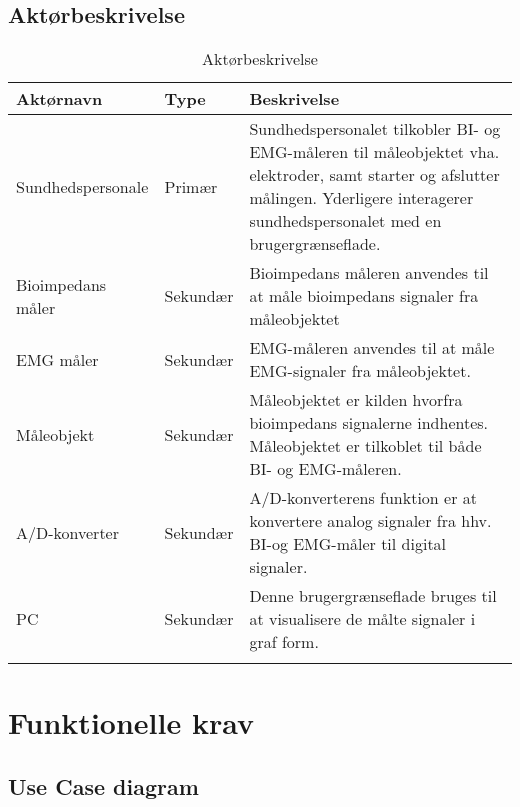 \documentclass[main.tex]{subfiles}
\begin{document}
\subsection{Aktørbeskrivelse}
\begin{table}[H]
\begin{tabularx}{\textwidth}{l l X}
     Aktørnavn	&	Type		&	Beskrivelse \\ \midrule
     Sundhedspersonale   	&  	Primær  	& 	Sundhedspersonalet tilkobler BI- og EMG-måleren til måleobjektet vha. elektroder, samt starter og afslutter målingen. Yderligere interagerer sundhedspersonalet med en brugergrænseflade.     \\ 			  \addlinespace[2mm]
     Bioimpedans måler	&	Sekundær	& Bioimpedans måleren anvendes til at måle bioimpedans signaler fra måleobjektet  	 \\   \addlinespace[2mm]

  EMG måler	&	Sekundær	&	EMG-måleren anvendes til at måle EMG-signaler fra måleobjektet.
     \\   \addlinespace[2mm]
    
    Måleobjekt	&	Sekundær	&	Måleobjektet er kilden  hvorfra bioimpedans signalerne indhentes. Måleobjektet er tilkoblet til både BI- og EMG-måleren.
     \\   \addlinespace[2mm]
     
 A/D-konverter	&	Sekundær	&	A/D-konverterens funktion er at konvertere analog signaler fra hhv. BI-og EMG-måler  til digital signaler.
     \\   \addlinespace[2mm]      
    PC	&	Sekundær	&	Denne brugergrænseflade bruges til at visualisere de målte signaler i graf form.
     \\   \addlinespace[2mm]
     
   
     \bottomrule                                                                                                                   
    \end{tabularx}
    \caption {Aktørbeskrivelse}
    \label{tab:aktoerbeskrivelse}
	
\end{table}


\section{Funktionelle krav}
\subsection{Use Case diagram}
\end{document}
